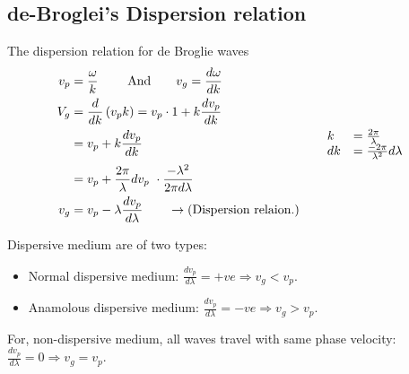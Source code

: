 \subsection{de-Broglei's Dispersion relation}
The dispersion relation for de Broglie waves 
\begin{align}
v_{p}&=\frac{\omega}{k}\ \qquad \text{And}\qquad v_{g}=\frac{d\omega}{dk}\\
V_{g} &=\frac{d}{d k}\left(v_{p} k\right) 
=v_{p}\cdot 1+ k \frac{d v_{p}}{d k} \notag \\
&=v_{p}+k \frac{d v_{p}}{d{k}} \hspace{5cm}  \begin{array}{ll}
k&=\frac{2 \pi}{\lambda}\\
dk&=\frac{-2 \pi}{\lambda^{2}} d\lambda
\end{array}  \\
&=v_{p}+\frac{2 \pi}{\lambda}  d v_{p}\ \cdot \frac{-\lambda^{2}}{2 \pi d \lambda} \notag \\
v_{g} &=v_{p}-\lambda \frac{d v_{p}}{d \lambda}  \qquad\rightarrow (\text{Dispersion relaion.})
\end{align}
\begin{center}
\end{center}
Dispersive medium are of two types:
\begin{itemize}
	\item  Normal dispersive medium: $\frac{d v_{p}}{d \lambda}=+v e \Rightarrow v_{g}<v_{p}$.
	\item  Anamolous dispersive medium: $\frac{d v_{p}}{d \lambda}=-v e\Rightarrow v_{g}>v_{p}$.
\end{itemize}
For, non-dispersive medium, all waves travel with same phase velocity: $\frac{d v_{p}}{d \lambda}=0 \Rightarrow v_{g}=v_{p}$.
